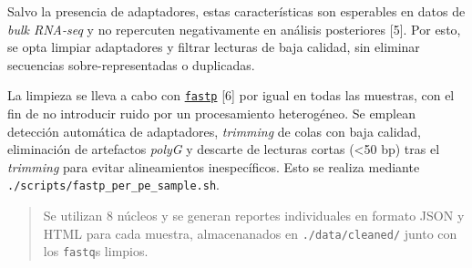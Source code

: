 \documentclass[
  12pt,
  letterpaper,
  DIV=11,
  numbers=noendperiod]{scrartcl}
\begin{document}
Salvo la presencia de adaptadores, estas características son esperables
en datos de \emph{bulk RNA-seq} y no repercuten negativamente en
análisis posteriores {[}5{]}. Por esto, se opta limpiar adaptadores y
filtrar lecturas de baja calidad, sin eliminar secuencias
sobre-representadas o duplicadas.

La limpieza se lleva a cabo con
\href{https://pmc.ncbi.nlm.nih.gov/articles/PMC6129281/}{\texttt{fastp}}
{[}6{]} por igual en todas las muestras, con el fin de no introducir
ruido por un procesamiento heterogéneo. Se emplean detección automática
de adaptadores, \emph{trimming} de colas con baja calidad, eliminación
de artefactos \emph{polyG} y descarte de lecturas cortas (\textless50
bp) tras el \emph{trimming} para evitar alineamientos inespecíficos.
Esto se realiza mediante \texttt{./scripts/fastp\_per\_pe\_sample.sh}.

\begin{quote}
Se utilizan 8 núcleos y se generan reportes individuales en formato JSON
y HTML para cada muestra, almacenanados en \texttt{./data/cleaned/}
junto con los \texttt{fastq}s limpios.
\end{quote}
\end{document}
